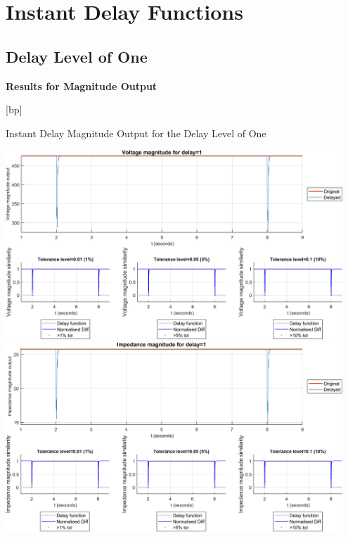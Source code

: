 \section{Instant Delay Functions}
\newpage \subsection{Delay Level of One}
\textbf{Results for Magnitude Output}
\begin{floatingfigure}[p]{\textwidth}[bp]
    \caption{Instant Delay Magnitude Output for the Delay Level of One}
    \includegraphics[width=0.95\textwidth]{PMUsim-figures/DelayOf_1/Instant_vMagnitude.png}    
      \includegraphics[width=0.95\textwidth]{PMUsim-figures/DelayOf_1/Instant_iMagnitude.png}      
    \label{fig:PMUsim_One_Magnitude}
\end{floatingfigure}
    \begin{small}
     \end{small}

